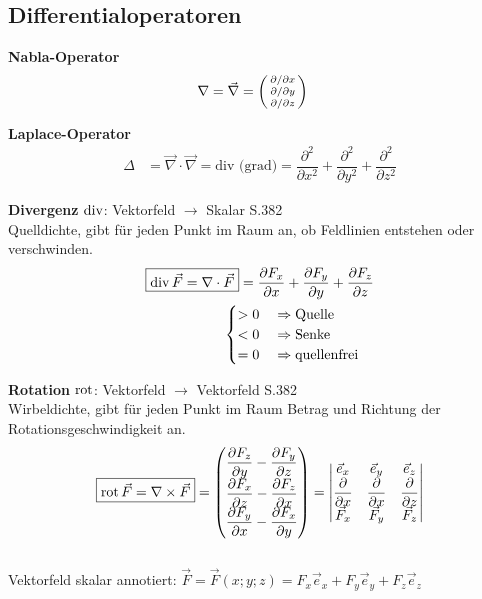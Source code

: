 \subsection{Differentialoperatoren}
\textbf{Nabla-Operator}
\begin{align*}
	\nabla & = \vec{\nabla} =
	\begin{psmallmatrix}
		\partial  / \partial x \\
		\partial  / \partial y \\
		\partial  / \partial z
	\end{psmallmatrix}
\end{align*}

\textbf{Laplace-Operator}
\begin{align*}
	\varDelta & = \vec{\nabla} \cdot \vec{\nabla} = \textrm{div (grad)} =
	\dfrac{\partial ^2}{\partial x^2}+\dfrac{\partial ^2}{\partial y^2}+\dfrac{\partial ^2}{\partial z^2}
\end{align*}

\textbf{Divergenz} $\operatorname{div}$: Vektorfeld $\rightarrow$ Skalar \qquad S.382\\
\small{Quelldichte, gibt für jeden Punkt im Raum an, ob Feldlinien entstehen oder verschwinden.}
\begin{align*}
	\boxed{\operatorname{div} \vec{F} = \nabla \cdot \vec{F}}   =  \dfrac{\partial F_x}{\partial x}
	+ \dfrac{\partial F_y}{\partial y} + \dfrac{\partial F_z}{\partial z} \\
	\begin{cases}
		> 0 \quad\Rightarrow \textnormal{Quelle} \\
		< 0 \quad\Rightarrow \textnormal{Senke}  \\
		= 0 \quad\Rightarrow \textnormal{quellenfrei}
	\end{cases}
\end{align*}

\textbf{Rotation} $\operatorname{rot}$: Vektorfeld $\rightarrow$ Vektorfeld \qquad S.382\\
\small{Wirbeldichte, gibt für jeden Punkt im Raum Betrag und Richtung der Rotationsgeschwindigkeit an.}
\begin{align*}
	\boxed{\operatorname{rot} \vec{F} = \nabla \times \vec{F} } =
	\begin{pmatrix}
		\dfrac{\partial F_z}{\partial y} - \dfrac{\partial F_y}{\partial z} \\
		\dfrac{\partial F_x}{\partial z} - \dfrac{\partial F_z}{\partial x} \\
		\dfrac{\partial F_y}{\partial x} - \dfrac{\partial F_x}{\partial y}
	\end{pmatrix} =
	\begin{vmatrix}
		\vec{e}_x                    & \vec{e}_y                     & \vec{e}_z                     \\
		\dfrac{\partial}{\partial x} & \dfrac{\partial }{\partial x} & \dfrac{\partial }{\partial z} \\
		\vec{F}_x                    & \vec{F}_y                     & \vec{F}_z
	\end{vmatrix}
\end{align*}\\
Vektorfeld skalar annotiert: $\vec{F} = \vec{F}(x;y;z) = F_x\vec{e}_x+F_y\vec{e}_y+F_z\vec{e}_z$\\

